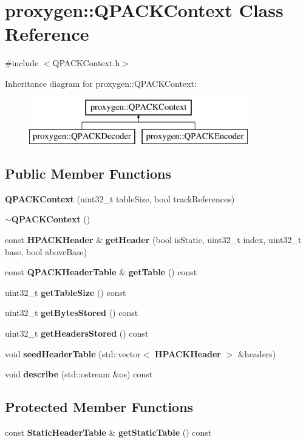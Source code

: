 \section{proxygen\+:\+:Q\+P\+A\+C\+K\+Context Class Reference}
\label{classproxygen_1_1QPACKContext}


{\ttfamily \#include $<$Q\+P\+A\+C\+K\+Context.\+h$>$}

Inheritance diagram for proxygen\+:\+:Q\+P\+A\+C\+K\+Context\+:\begin{figure}[H]
\begin{center}
\leavevmode
\includegraphics[height=2.000000cm]{classproxygen_1_1QPACKContext}
\end{center}
\end{figure}
\subsection*{Public Member Functions}
\begin{DoxyCompactItemize}
\item 
{\bf Q\+P\+A\+C\+K\+Context} (uint32\+\_\+t table\+Size, bool track\+References)
\item 
{\bf $\sim$\+Q\+P\+A\+C\+K\+Context} ()
\item 
const {\bf H\+P\+A\+C\+K\+Header} \& {\bf get\+Header} (bool is\+Static, uint32\+\_\+t index, uint32\+\_\+t base, bool above\+Base)
\item 
const {\bf Q\+P\+A\+C\+K\+Header\+Table} \& {\bf get\+Table} () const 
\item 
uint32\+\_\+t {\bf get\+Table\+Size} () const 
\item 
uint32\+\_\+t {\bf get\+Bytes\+Stored} () const 
\item 
uint32\+\_\+t {\bf get\+Headers\+Stored} () const 
\item 
void {\bf seed\+Header\+Table} (std\+::vector$<$ {\bf H\+P\+A\+C\+K\+Header} $>$ \&headers)
\item 
void {\bf describe} (std\+::ostream \&os) const 
\end{DoxyCompactItemize}
\subsection*{Protected Member Functions}
\begin{DoxyCompactItemize}
\item 
const {\bf Static\+Header\+Table} \& {\bf get\+Static\+Table} () const 
\end{DoxyCompactItemize}
